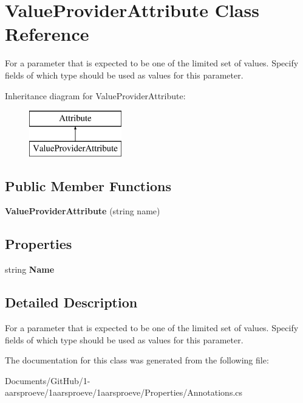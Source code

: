 \hypertarget{class_value_provider_attribute}{}\section{Value\+Provider\+Attribute Class Reference}
\label{class_value_provider_attribute}


For a parameter that is expected to be one of the limited set of values. Specify fields of which type should be used as values for this parameter.  


Inheritance diagram for Value\+Provider\+Attribute\+:\begin{figure}[H]
\begin{center}
\leavevmode
\includegraphics[height=2.000000cm]{class_value_provider_attribute}
\end{center}
\end{figure}
\subsection*{Public Member Functions}
\begin{DoxyCompactItemize}
\item 
\hypertarget{class_value_provider_attribute_a00abe8fdb0c50afa23f3c14688b0fe9f}{}{\bfseries Value\+Provider\+Attribute} (string name)\label{class_value_provider_attribute_a00abe8fdb0c50afa23f3c14688b0fe9f}

\end{DoxyCompactItemize}
\subsection*{Properties}
\begin{DoxyCompactItemize}
\item 
\hypertarget{class_value_provider_attribute_a954d0ecb3682e337a4c174d238bdd892}{}string {\bfseries Name}\label{class_value_provider_attribute_a954d0ecb3682e337a4c174d238bdd892}

\end{DoxyCompactItemize}


\subsection{Detailed Description}
For a parameter that is expected to be one of the limited set of values. Specify fields of which type should be used as values for this parameter. 



The documentation for this class was generated from the following file\+:\begin{DoxyCompactItemize}
\item 
Documents/\+Git\+Hub/1-\/aarsproeve/1aarsproeve/1aarsproeve/\+Properties/Annotations.\+cs\end{DoxyCompactItemize}
